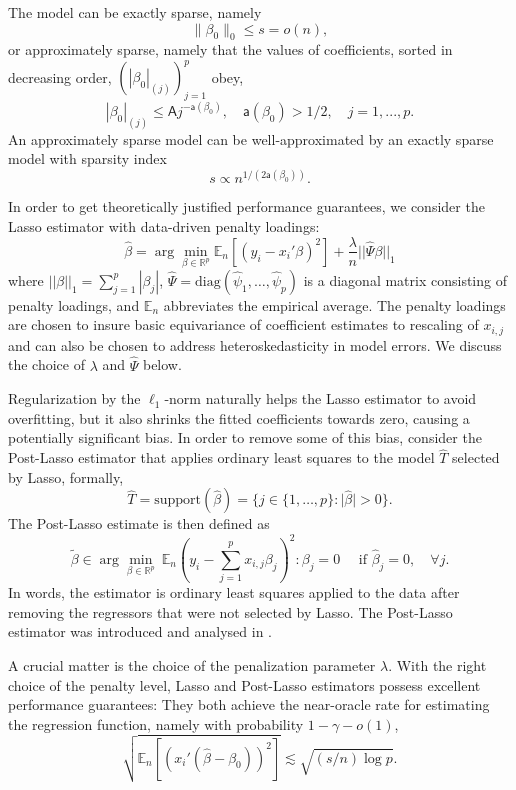 \documentclass{amsart}\usepackage[]{graphicx}\usepackage[]{color}
\begin{document}
The model can be exactly sparse, namely
\[
\| \beta_0\|_0 \leq s = o(n),
\]
or approximately sparse, namely that the values of coefficients, sorted in decreasing
order, $(| \beta_0|_{(j)})_{j=1}^p$ obey,
\[
| \beta_0|_{(j)} \leq \mathsf{A} j^{-\mathsf{a}(\beta_0)},  \quad \mathsf{a}(\beta_0)>1/2, \quad j=1,...,p.
\]
An approximately sparse model can be well-approximated by an exactly sparse model
with sparsity index \[s \propto n^{1/(2 \mathsf{a}(\beta_0))}.\]





In order to get  theoretically justified performance guarantees,  we consider the Lasso 
estimator with data-driven penalty loadings: 
\[ \hat \beta = \arg \min_{\beta \in  \mathbb{R}^p} \mathbb{E}_n [(y_i - x_i' \beta)^2] + \frac{\lambda}{n} ||\hat{\Psi} \beta||_1 \]
where $||\beta||_1=\sum_{j=1}^p |\beta_j|$, $\hat{\Psi}=\mathrm{diag}(\hat{\psi}_1,\ldots,\hat{\psi}_p)$ is a diagonal matrix consisting of  penalty loadings, and $\mathbb{E}_n$ abbreviates the empirical average. The penalty loadings are chosen to insure basic equivariance of coefficient estimates to rescaling of $x_{i,j}$ and can also be chosen to address heteroskedasticity in model errors.   We discuss the choice of $\lambda$ and $\hat \Psi$ below.

Regularization by the $\ell_1$-norm naturally helps the Lasso estimator to avoid overfitting, but it also shrinks the fitted coefficients towards zero, causing a potentially significant bias. In order to remove some of this bias,  consider the Post-Lasso estimator that applies ordinary least squares to the model $\hat{T}$ selected by Lasso, formally, 
\[ \hat{T} = \text{support}(\hat{\beta}) = \{ j \in \{ 1, \ldots,p\}: \lvert \hat{\beta} \rvert >0 \}. \]
The Post-Lasso estimate is then defined as
\[ \tilde{\beta} \in \arg\min_{\beta \in \mathbb{R}^p}  \ \mathbb{E}_n \left( y_i - \sum_{j=1}^p x_{i,j} \beta_j \right) ^2: \beta_j=0 \quad \text{ if } \hat \beta_j = 0 , \quad \forall j. \]
In words, the estimator is ordinary least squares applied to the data after removing the regressors that were not selected by Lasso. The Post-Lasso estimator was introduced and analysed in \citet{BC-Postlasso}.


A crucial matter is the choice of the penalization parameter $\lambda$.   With the right choice
of the penalty level, Lasso and Post-Lasso estimators possess excellent performance guarantees: They both achieve the near-oracle rate for estimating the regression function, namely with probability $1- \gamma - o(1)$,
\[
\sqrt{\mathbb{E}_n [ (x_{i}'(\hat \beta - \beta_0))^2 ] } \lesssim \sqrt{(s/n) \log p}. 
\]
\end{document}
